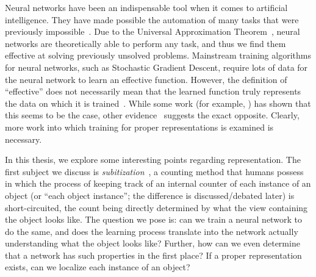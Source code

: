 Neural networks have been an indispensable tool when it comes to artificial intelligence. They have
made possible the automation of many tasks that were previously impossible~\cite{redmon2016look,
ILSVRC15}. Due to the Universal Approximation Theorem~\cite{HORNIK1989359}, neural networks are
theoretically able to perform any task, and thus we find them effective at solving previously
unsolved problems. Mainstream training algorithms for neural networks, such as Stochastic Gradient
Descent, require lots of data for the neural network to learn an effective function. However, the
definition of ``effective'' does not necessarily mean that the learned function truly represents the
data on which it is trained~\cite{szegedy2014intriguing}. While some work (for example,
\cite{yosinski2015understanding}) has shown that this seems to be the case, other
evidence~\cite{szegedy2014intriguing} suggests the exact opposite. Clearly, more work into which
training for proper representations is examined is necessary.

In this thesis, we explore some interesting points regarding representation. The first subject we
discuss is \textit{subitization}~\cite{10.2307/1418556, subitizingyoutube}, a counting method that
humans possess in which the process of keeping track of an internal counter of each instance of an
object (or ``each object instance''; the difference is discussed/debated later) is short-circuited,
the count being directly determined by what the view containing the object looks like. The question
we pose is: can we train a neural network to do the same, and does the learning process translate
into the network actually understanding what the object looks like? Further, how can we even
determine that a network has such properties in the first place? If a proper representation exists,
can we localize each instance of an object?

